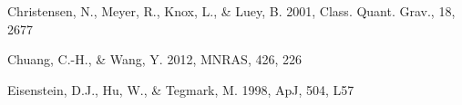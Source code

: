 \documentclass[iop]{emulateapj}
\begin{document}
\begin{thebibliography}{}







Christensen, N., Meyer, R., Knox, L., \& Luey, B. 2001, Class. Quant. Grav., 18, 2677


Chuang, C.-H., \& Wang, Y. 2012, MNRAS, 426, 226  






Eisenstein, D.J., Hu, W., \& Tegmark, M. 1998, ApJ, 504, L57








\end{thebibliography}
\end{document}
